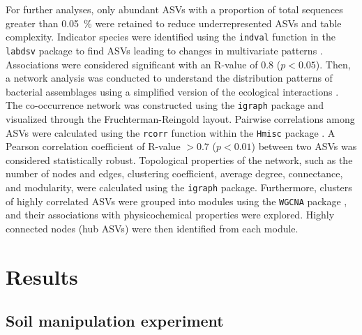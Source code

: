 For further analyses, only abundant ASVs with a proportion of total sequences greater than \SI{0.05}{\percent} were retained to reduce underrepresented ASVs and table complexity. Indicator species were identified using the \texttt{indval} function in the \texttt{labdsv} package to find ASVs leading to changes in multivariate patterns \citep{Roberts2016}. Associations were considered significant with an R-value of 0.8 (\(p < 0.05\)). Then, a network analysis was conducted to understand the distribution patterns of bacterial assemblages using a simplified version of the ecological interactions \citep{Barberan2012, Qian2018}. The co-occurrence network was constructed using the \texttt{igraph} package \citep{Csardi2006} and visualized through the Fruchterman-Reingold layout. Pairwise correlations among ASVs were calculated using the \texttt{rcorr} function within the \texttt{Hmisc} package \citep{Harrell2019}. A Pearson correlation coefficient of R-value \(>0.7\) (\(p < 0.01\)) between two ASVs was considered statistically robust. Topological properties of the network, such as the number of nodes and edges, clustering coefficient, average degree, connectance, and modularity, were calculated using the \texttt{igraph} package. Furthermore, clusters of highly correlated ASVs were grouped into modules using the \texttt{WGCNA} package \citep{Langfelder2008}, and their associations with physicochemical properties were explored. Highly connected nodes (hub ASVs) were then identified from each module.

\section{Results}
\subsection{Soil manipulation experiment}

